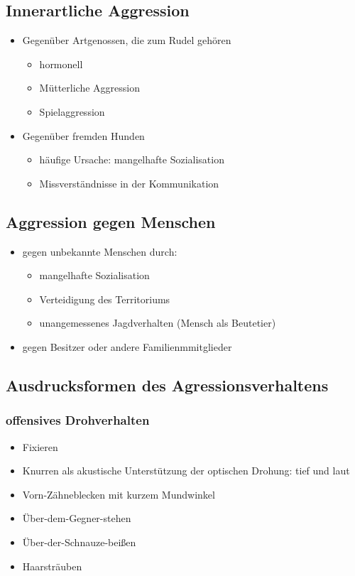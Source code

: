     \subsection{Innerartliche Aggression}
        \begin{itemize}
            \item Gegenüber Artgenossen, die zum Rudel gehören
            \begin{itemize}
                \item hormonell
                \item Mütterliche Aggression
                \item Spielaggression
            \end{itemize}
            \item Gegenüber fremden Hunden
            \begin{itemize}
                \item häufige Ursache: mangelhafte Sozialisation
                \item Missverständnisse in der Kommunikation
            \end{itemize}
        \end{itemize}

    \subsection{Aggression gegen Menschen}
        \begin{itemize}
            \item gegen unbekannte Menschen durch:
            \begin{itemize}
                \item mangelhafte Sozialisation
                \item Verteidigung des Territoriums
                \item unangemessenes Jagdverhalten (Mensch als Beutetier)
            \end{itemize}
            \item gegen Besitzer oder andere Familienmmitglieder
        \end{itemize}

    \subsection{Ausdrucksformen des Agressionsverhaltens}
        \subsubsection{offensives Drohverhalten}
            \begin{itemize}
                \item Fixieren
                \item Knurren als akustische Unterstützung der optischen Drohung: tief und laut
                \item Vorn-Zähneblecken mit kurzem Mundwinkel
                \item Über-dem-Gegner-stehen
                \item Über-der-Schnauze-beißen
                \item Haarsträuben
            \end{itemize}
